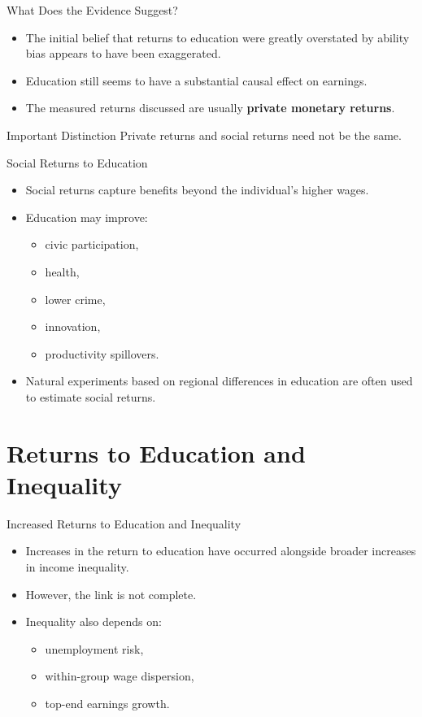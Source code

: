 \documentclass[aspectratio=169]{beamer}
\begin{document}
\begin{frame}{What Does the Evidence Suggest?}
\transfade
\begin{itemize}
  \item The initial belief that returns to education were greatly overstated by ability bias appears to have been exaggerated.
  \item Education still seems to have a substantial causal effect on earnings.
  \item The measured returns discussed are usually \textbf{private monetary returns}.
\end{itemize}

\begin{block}{Important Distinction}
Private returns and social returns need not be the same.
\end{block}
\end{frame}

\begin{frame}{Social Returns to Education}
\transfade
\begin{itemize}
  \item Social returns capture benefits beyond the individual's higher wages.
  \item Education may improve:
  \begin{itemize}
    \item civic participation,
    \item health,
    \item lower crime,
    \item innovation,
    \item productivity spillovers.
  \end{itemize}
  \item Natural experiments based on regional differences in education are often used to estimate social returns.
\end{itemize}
\end{frame}

\section{Returns to Education and Inequality}

\begin{frame}{Increased Returns to Education and Inequality}
\transfade
\begin{itemize}
  \item Increases in the return to education have occurred alongside broader increases in income inequality.
  \item However, the link is not complete.
  \item Inequality also depends on:
  \begin{itemize}
    \item unemployment risk,
    \item within-group wage dispersion,
    \item top-end earnings growth.
  \end{itemize}
\end{itemize}
\end{frame}
\end{document}
